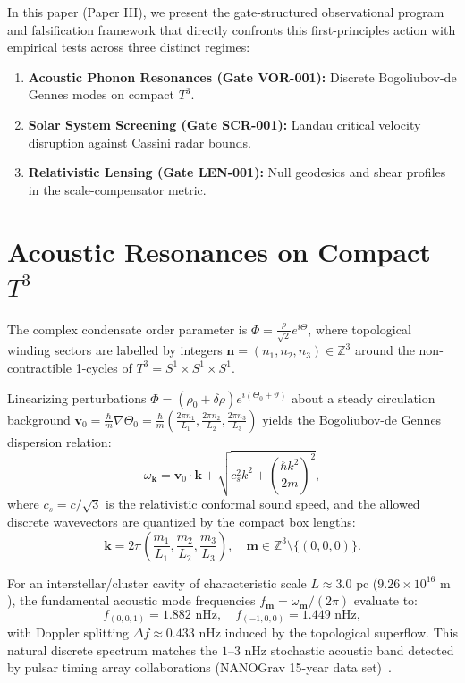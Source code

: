 \documentclass[aps,prd,twocolumn,superscriptaddress,nofootinbib,amsmath,amssymb]{revtex4-2}
\begin{document}
In this paper (Paper III), we present the gate-structured observational program and falsification framework that directly confronts this first-principles action with empirical tests across three distinct regimes:
\begin{enumerate}
    \item \textbf{Acoustic Phonon Resonances (Gate VOR-001):} Discrete Bogoliubov-de Gennes modes on compact $T^3$.
    \item \textbf{Solar System Screening (Gate SCR-001):} Landau critical velocity disruption against Cassini radar bounds.
    \item \textbf{Relativistic Lensing (Gate LEN-001):} Null geodesics and shear profiles in the scale-compensator metric.
\end{enumerate}

\section{Acoustic Resonances on Compact $T^3$}
\label{sec:vor}

The complex condensate order parameter is $\Phi = \frac{\rho}{\sqrt{2}} e^{i\Theta}$, where topological winding sectors are labelled by integers $\mathbf{n} = (n_1, n_2, n_3) \in \mathbb{Z}^3$ around the non-contractible 1-cycles of $T^3 = S^1 \times S^1 \times S^1$.

Linearizing perturbations $\Phi = (\rho_0 + \delta\rho) e^{i(\Theta_0 + \vartheta)}$ about a steady circulation background $\mathbf{v}_0 = \frac{\hbar}{m}\nabla\Theta_0 = \frac{\hbar}{m} \left(\frac{2\pi n_1}{L_1}, \frac{2\pi n_2}{L_2}, \frac{2\pi n_3}{L_3}\right)$ yields the Bogoliubov-de Gennes dispersion relation:
\begin{equation}
\omega_{\mathbf{k}} = \mathbf{v}_0 \cdot \mathbf{k} + \sqrt{ c_s^2 k^2 + \left(\frac{\hbar k^2}{2m}\right)^2 },
\label{eq:bogoliubov}
\end{equation}
where $c_s = c/\sqrt{3}$ is the relativistic conformal sound speed, and the allowed discrete wavevectors are quantized by the compact box lengths:
\begin{equation}
\mathbf{k} = 2\pi \left( \frac{m_1}{L_1}, \frac{m_2}{L_2}, \frac{m_3}{L_3} \right), \quad \mathbf{m} \in \mathbb{Z}^3 \setminus \{(0,0,0)\}.
\end{equation}

For an interstellar/cluster cavity of characteristic scale $L \approx 3.0\text{ pc}$ ($9.26 \times 10^{16}\text{ m}$), the fundamental acoustic mode frequencies $f_{\mathbf{m}} = \omega_{\mathbf{m}} / (2\pi)$ evaluate to:
\begin{equation}
f_{(0,0,1)} = 1.882\text{ nHz}, \quad f_{(-1,0,0)} = 1.449\text{ nHz},
\end{equation}
with Doppler splitting $\Delta f \approx 0.433\text{ nHz}$ induced by the topological superflow. This natural discrete spectrum matches the $1\text{--}3\text{ nHz}$ stochastic acoustic band detected by pulsar timing array collaborations (NANOGrav 15-year data set)~\cite{nanograv_15yr}.
\end{document}
